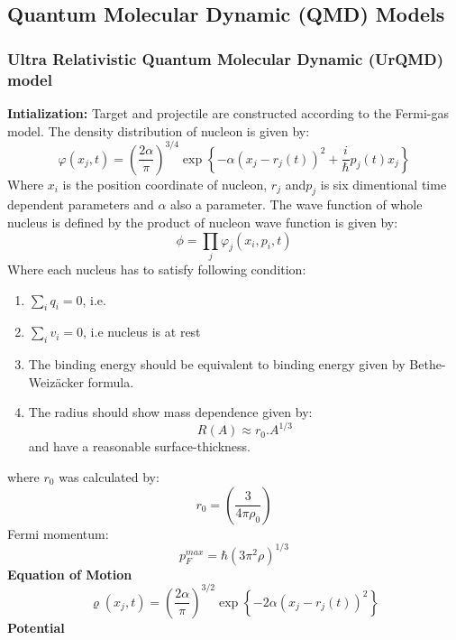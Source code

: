\subsection{Quantum Molecular Dynamic (QMD) Models}
\subsubsection{Ultra Relativistic Quantum Molecular Dynamic (UrQMD) model}
\textbf{Intialization:}
Target and projectile are constructed according to the Fermi-gas model. The density distribution of nucleon is given by:
\begin{equation}
	\varphi\left(x_j,t\right)=\left(\frac{2\alpha}{\pi}\right)^{3/4}\exp\left\{-\alpha(x_j-r_j(t))^2+\frac{i}{\hbar}p_j(t)x_j\right\}
\end{equation}
Where $x_i$ is the position coordinate of nucleon, $r_j$ and$p_j$ is six dimentional time dependent parameters and $\alpha$ also a  parameter. The wave function of whole nucleus is defined by the product of nucleon wave function is given by:
\begin{equation}
	\phi=\prod_{j}\varphi_j(x_i,p_i,t)
\end{equation} 
Where each nucleus has to satisfy following condition:
\begin{enumerate}
	\item $\sum_{i}q_i=0$, i.e.
	\item $\sum_{i}v_i=0$, i.e nucleus is at rest
	\item The binding energy  should be equivalent to binding energy given by Bethe-Weiz\"{a}cker formula.
	\item The radius should show mass dependence given by:
	\begin{equation}
		R(A)\approx r_0.A^{1/3}
	\end{equation}
and have a reasonable surface-thickness.  

\end{enumerate} 
where $r_0$ was calculated by:
\begin{equation}
	r_0 = \left(\frac{3}{4\pi\rho_{0}}\right)
\end{equation}
Fermi momentum:
\begin{equation}
	p_F^{max}=\hbar\left(3\pi^2\rho\right)^{1/3}
\end{equation}
\textbf{Equation of Motion}
\begin{equation}
	\varrho(x_j,t)=\left(\frac{2\alpha}{\pi}\right)^{3/2}\exp\left\{-2\alpha(x_j-r_j(t))^2\right\}
\end{equation}
\textbf{Potential}

